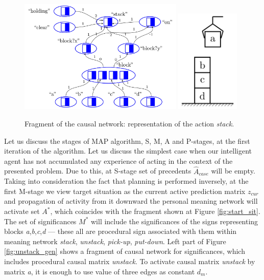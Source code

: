 \documentclass[review]{elsarticle}
\begin{document}
\begin{figure}
	\centering
	\includegraphics[width=0.7\textwidth]{plan_nets-1}
	\includegraphics[width=0.27\textwidth]{block_world-2}
	\caption{Fragment of the causal network: representation of the action \textit{stack}.}	
	\label{fig:stack_sig}	
\end{figure}

Let us discuss the stages of MAP algorithm, S, M, A and P-stages, at the first iteration of the algorithm. Let us discuss the simplest case when our intelligent agent has not accumulated any experience of acting in the context of the presented problem. Due to this, at S-stage set of precedents $\hat A_{case}$ will be empty. Taking into consideration the fact that planning is performed inversely, at the first M-stage we view target situation as the current active prediction matrix $z_{cur}$ and propagation of activity from it downward the personal meaning network will activate set $A^*$, which coincides with the fragment shown at Figure \ref{fig:start_sit}. The set of significances $M^*$ will include the significances of the signs representing blocks \textit{a},\textit{b},\textit{c},\textit{d} --- these all are procedural sign associated with them within meaning network \textit{stack}, \textit{unstack}, \textit{pick-up}, \textit{put-down}. Left part of Figure \ref{fig:unstack_gen} shows a fragment of causal network for significances, which includes procedural causal matrix \textit{unstack}. To activate causal matrix \textit{unstack} by matrix \textit{a}, it is enough to use value of three edges as constant $d_m$.
\end{document}
